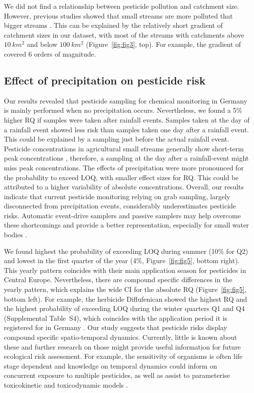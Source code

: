 \documentclass[journal=esthag,manuscript=article]{achemso}
\begin{document}
We did not find a relationship between pesticide pollution and catchment size.
However, previous studies showed that small streams are more polluted that bigger streams \citep{schulz_field_2004,stehle_pesticide_2015,knauer_pesticides_2016}.
This can be explained by the relatively short gradient of catchment sizes in our dataset, with most of the streams with catchments above $10~km^2$ and below $100~km^2$ (Figure~\ref{fig:fig3}, top).
For example, the gradient of \citet{schulz_field_2004} covered 6 orders of magnitude.


\subsection{Effect of precipitation on pesticide risk}
Our results revealed that pesticide sampling for chemical monitoring in Germany is mainly performed when no precipitation occurs. 
Nevertheless, we found a 5\% higher RQ if samples were taken after rainfall events. 
Samples taken at the day of a rainfall event showed less risk than samples taken one day after a rainfall event.
This could be explained by a sampling just before the actual rainfall event.
Pesticide concentrations in agricultural small streams generally show short-term peak concentrations \citep{wittmer_significance_2010}, therefore, a sampling at the day after a rainfall-event might miss peak concentrations.
The effects of precipitation were more pronounced for the probability to exceed LOQ, with smaller effect sizes for RQ.
This could be attributed to a higher variability of absolute concentrations.
Overall, our results indicate that current pesticide monitoring relying on grab sampling, largely disconnected from precipitation events, considerably underestimates pesticide risks.
Automatic event-drive samplers \citep{stehle_probabilistic_2013} and passive samplers \citep{fernandez_calibration_2014,moschet_evaluation_2015} may help overcome these shortcomings and provide a better representation, especially for small water bodies \citep{lorenz_specifics_2016}. 

We found highest the probability of exceeding LOQ during summer (10\% for Q2) and lowest in the first quarter of the year (4\%, Figure~\ref{fig:fig5}, bottom right).
This yearly pattern coincides with their main application season for pesticides in Central Europe.
Nevertheless, there are compound specific differences in the yearly pattern, which explains the wide CI for the absolute RQ (Figure~\ref{fig:fig5}, bottom left).
For example, the herbicide Diflufenican showed the highest RQ and the highest probability of exceeding LOQ during the winter quarters Q1 and Q4 (Supplemental Table~S4), which coincides with the application period it is registered for in Germany \citep{bvl_online_2016}.
Our study suggests that pesticide risks display compound specific spatio-temporal dynamics.
Currently, little is known about these and further research on those might provide useful information for future ecological risk assessment. 
For example, the sensitivity of organisms is often life stage dependent \citep{hutchinson1998analysis} and knowledge on temporal dynamics could inform on concurrent exposure to multiple pesticides, as well as assist to parameterise toxicokinetic and toxicodynamic models \citep{ashauer2016modelling}. 
\end{document}
